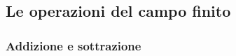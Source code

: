 

\subsection{Le operazioni del campo finito} %



\textsf{\small }

\subsubsection{Addizione e sottrazione} %



